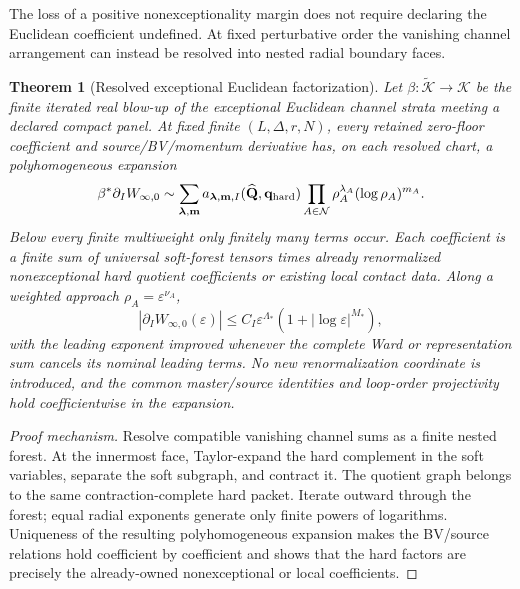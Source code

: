 \documentclass[11pt,a4paper,oneside]{book}
\theoremstyle{plain}
\newtheorem{theorem}{Theorem}[chapter]
\theoremstyle{definition}
\theoremstyle{remark}
\newcommand{\src}[2]{\cite{#1}}
\begin{document}
\src{PG44}{thm:v43-ir-one-excess,thm:v43-zero-floor,thm:v43-uv-ir-commute,thm:v43-master,thm:v43-projective}

The loss of a positive nonexceptionality margin does not require declaring the
Euclidean coefficient undefined.  At fixed perturbative order the vanishing
channel arrangement can instead be resolved into nested radial boundary faces.

\begin{theorem}[Resolved exceptional Euclidean factorization]
\label{thm:resolved-exceptional-euclidean}
Let $\beta:\widetilde{\mathcal K}\to\mathcal K$ be the finite iterated real
blow-up of the exceptional Euclidean channel strata meeting a declared compact
panel.  At fixed finite $(L,\Delta,r,N)$, every retained zero-floor coefficient
and source/BV/momentum derivative has, on each resolved chart, a
polyhomogeneous expansion
\begin{equation}
 \beta^*\partial_IW_{\infty,0}
 \sim
 \sum_{\boldsymbol\lambda,\mathbf m}
 a_{\boldsymbol\lambda,\mathbf m,I}
 (\widehat{\mathbf Q},\mathbf q_{\rm hard})
 \prod_{A\in\mathcal N}
 \rho_A^{\lambda_A}(\log\rho_A)^{m_A}.
 \label{eq:exceptional-polyhomogeneous}
\end{equation}
Below every finite multiweight only finitely many terms occur.  Each
coefficient is a finite sum of universal soft-forest tensors times already
renormalized nonexceptional hard quotient coefficients or existing local
contact data.  Along a weighted approach $\rho_A=\varepsilon^{\nu_A}$,
\begin{equation}
 |\partial_IW_{\infty,0}(\varepsilon)|
 \le C_I\varepsilon^{\Lambda_*}
 (1+|\log\varepsilon|^{M_*}),
 \label{eq:exceptional-power-log}
\end{equation}
with the leading exponent improved whenever the complete Ward or representation
sum cancels its nominal leading terms.  No new renormalization coordinate is
introduced, and the common master/source identities and loop-order projectivity
hold coefficientwise in the expansion.
\end{theorem}
\begin{proof}[Proof mechanism]
Resolve compatible vanishing channel sums as a finite nested forest.  At the
innermost face, Taylor-expand the hard complement in the soft variables,
separate the soft subgraph, and contract it.  The quotient graph belongs to the
same contraction-complete hard packet.  Iterate outward through the forest;
equal radial exponents generate only finite powers of logarithms.  Uniqueness
of the resulting polyhomogeneous expansion makes the BV/source relations hold
coefficient by coefficient and shows that the hard factors are precisely the
already-owned nonexceptional or local coefficients.
\end{proof}
\src{PG44}{thm:v44-polyhomogeneous,thm:v44-power-log,prop:v44-hard-v43,thm:v44-close}
\end{document}
